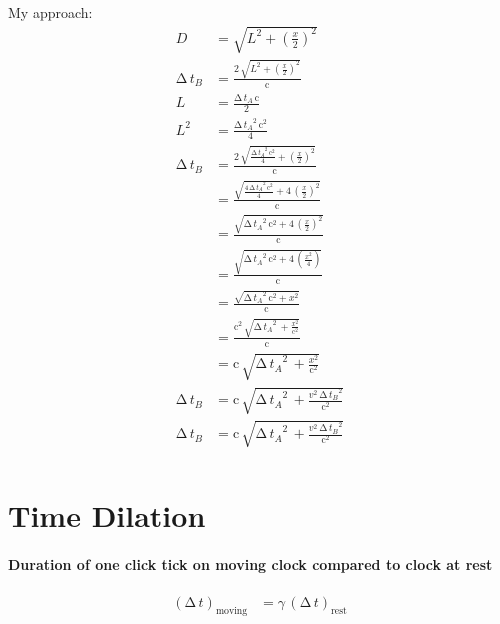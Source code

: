 \documentclass[pagesize,headsepline,10pt,parskip=half]{scrreprt}
\newcommand*\mdelta[1]{\ensuremath{\mathrm{\Delta\,}#1}}
\newenvironment{aside}
{\begin{mdframed}[style=0,%
  leftline=false,rightline=false,leftmargin=2em,rightmargin=2em,%
  innerleftmargin=0pt,innerrightmargin=0pt,linewidth=0.75pt,%
  skipabove=7pt,skipbelow=7pt]\small}
{\end{mdframed}}
\newcommand{\const}[1]{\ensuremath{\mathrm{#1}}}
\renewcommand{\c}{\const{c}}
\begin{document}
        \begin{samepage}
          \begin{aside}
            My approach:
            \begin{align*}
              D &= \sqrt{L^2 + {\left(\frac{x}{2}\right)}^2} \\
              \mdelta{t_B} &= \frac{2\,\sqrt{L^2 + {\left(\frac{x}{2}\right)}^2} }{\c}\\
              L &= \frac{\mdelta{t_A}\,\c}{2}\\
              L^2 &= \frac{{\mdelta{t_A}}^2\,\c^2}{4}\\
              \mdelta{t_B} &= \frac{2\,\sqrt{\frac{{\mdelta{t_A}}^2\,\c^2}{4} + {\left(\frac{x}{2}\right)}^2} }{\c}\\
                &= \frac{\sqrt{\frac{4\,{\mdelta{t_A}}^2\,\c^2}{4} + 4\,{\left(\frac{x}{2}\right)}^2} }{\c}\\
                &= \frac{\sqrt{{\mdelta{t_A}}^2\,\c^2 + 4\,{\left(\frac{x}{2}\right)}^2} }{\c}\\
                &= \frac{\sqrt{{\mdelta{t_A}}^2\,\c^2 + 4\,\left(\frac{x^2}{4}\right)} }{\c}\\
                &= \frac{\sqrt{{\mdelta{t_A}}^2\,\c^2 + x^2} }{\c}\\
                &= \frac{\c^2\,\sqrt{{\mdelta{t_A}}^2\, + \frac{x^2}{\c^2}} }{\c}\\
                &= \c\,\sqrt{{\mdelta{t_A}}^2\, + \frac{x^2}{\c^2}}\\
                \mdelta{t_B} &= \c\,\sqrt{{\mdelta{t_A}}^2\, + \frac{v^2\,{\mdelta{t_B}}^2}{\c^2}}\\
                \mdelta{t_B} &= \c\,\sqrt{{\mdelta{t_A}}^2\, + \frac{v^2\,{\mdelta{t_B}}^2}{\c^2}}\\
            \end{align*}
          \end{aside}
        \end{samepage}

    \section{Time Dilation}
      \paragraph{Duration of one click tick on moving clock compared to clock at rest}
        \begin{align*}
          {\left(\mdelta{t}\right)}_{\text{moving}} &= \gamma\,{\left(\mdelta{t}\right)}_{\text{rest}}
        \end{align*}
\end{document}
